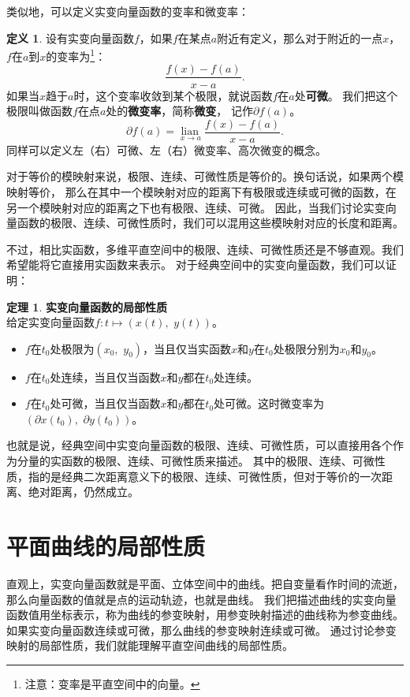 \documentclass[12pt,UTF8]{ctexbook}
\newcommand{\lian}[1]{
    \underset{#1}{\operatorname{lian}\,}
}
\theoremstyle{definition}
\newtheorem{df}{定义}[section]
\newtheorem{tm}{定理}[section]
\theoremstyle{plain}
\begin{document}
类似地，可以定义实变向量函数的变率和微变率：
\begin{df}
    设有实变向量函数$f$，如果$f$在某点$a$附近有定义，那么对于附近的一点$x$，$f$在$a$到$x$的变率为\footnote{注意：变率是平直空间中的向量。}：
    $$ \frac{f(x) - f(a)}{x - a}.$$
    如果当$x$趋于$a$时，这个变率收敛到某个极限，就说函数$f$在$a$处\textbf{可微}。
    我们把这个极限叫做函数$f$在点$a$处的\textbf{微变率}，简称\textbf{微变}，
    记作$\partial f(a)$。
    $$ \partial f(a) = \lian{{x\to a}} \frac{f(x) - f(a)}{x - a}. $$
    同样可以定义左（右）可微、左（右）微变率、高次微变的概念。
\end{df}

对于等价的模映射来说，极限、连续、可微性质是等价的。换句话说，如果两个模映射等价，
那么在其中一个模映射对应的距离下有极限或连续或可微的函数，在另一个模映射对应的距离之下也有极限、连续、可微。
因此，当我们讨论实变向量函数的极限、连续、可微性质时，我们可以混用这些模映射对应的长度和距离。

不过，相比实函数，多维平直空间中的极限、连续、可微性质还是不够直观。我们希望能将它直接用实函数来表示。
对于经典空间中的实变向量函数，我们可以证明：
\begin{tm}\label{tm:b-1-10}
    \textbf{实变向量函数的局部性质}\\
    给定实变向量函数$f: t\mapsto (x(t),\,\, y(t))$。
    \begin{itemize}
        \item $f$在$t_0$处极限为$(x_0,\,\,y_0)$，当且仅当实函数$x$和$y$在$t_0$处极限分别为$x_0$和$y_0$。
        \item $f$在$t_0$处连续，当且仅当函数$x$和$y$都在$t_0$处连续。
        \item $f$在$t_0$处可微，当且仅当函数$x$和$y$都在$t_0$处可微。这时微变率为$(\partial x(t_0),\,\,\partial y(t_0))$。
    \end{itemize}
\end{tm}
也就是说，经典空间中实变向量函数的极限、连续、可微性质，可以直接用各个作为分量的实函数的极限、连续、可微性质来描述。
其中的极限、连续、可微性质，指的是经典二次距离意义下的极限、连续、可微性质，但对于等价的一次距离、绝对距离，仍然成立。

\section{平面曲线的局部性质}

直观上，实变向量函数就是平面、立体空间中的曲线。把自变量看作时间的流逝，那么向量函数的值就是点的运动轨迹，也就是曲线。
我们把描述曲线的实变向量函数值用坐标表示，称为曲线的参变映射，用参变映射描述的曲线称为参变曲线。如果实变向量函数连续或可微，那么曲线的参变映射连续或可微。
通过讨论参变映射的局部性质，我们就能理解平直空间曲线的局部性质。
\end{document}
